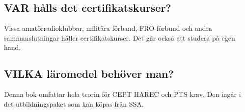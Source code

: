 \subsection*{VAR hålls det certifikatskurser?}

Vissa amatörradioklubbar, militära förband, FRO-förbund och andra
sammanslutningar håller certifikatskurser.
Det går också att studera på egen hand.

\subsection*{VILKA läromedel behöver man?}

Denna bok omfattar hela teorin för CEPT HAREC och PTS krav.
Den ingår i det utbildningspaket som kan köpas från SSA.

